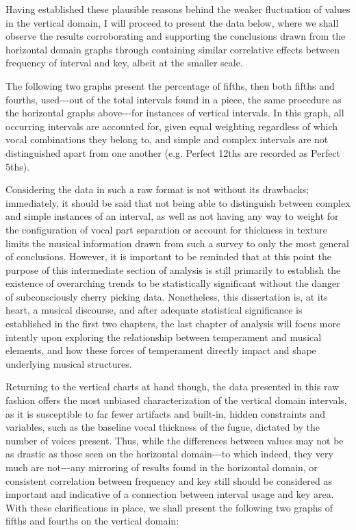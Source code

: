 Having established these plausible reasons behind the weaker fluctuation
of values in the vertical domain, I will proceed to present the data
below, where we shall observe the results corroborating and supporting
the conclusions drawn from the horizontal domain graphs through
containing similar correlative effects between frequency of interval and
key, albeit at the smaller scale.

    The following two graphs present the percentage of fifths, then both
fifths and fourths, used-\/-\/-out of the total intervals found in a
piece, the same procedure as the horizontal graphs above-\/-\/-for
instances of vertical intervals. In this graph, all occurring intervals
are accounted for, given equal weighting regardless of which vocal
combinations they belong to, and simple and complex intervals are not
distinguished apart from one another (e.g. Perfect 12ths are recorded as
Perfect 5ths).

Considering the data in such a raw format is not without its drawbacks;
immediately, it should be said that not being able to distinguish
between complex and simple instances of an interval, as well as not
having any way to weight for the configuration of vocal part separation
or account for thickness in texture limits the musical information drawn
from such a survey to only the most general of conclusions. However, it
is important to be reminded that at this point the purpose of this
intermediate section of analysis is still primarily to establish the
existence of overarching trends to be statistically significant without
the danger of subconsciously cherry picking data. Nonetheless, this
dissertation is, at its heart, a musical discourse, and after adequate
statistical significance is established in the first two chapters, the
last chapter of analysis will focus more intently upon exploring the
relationship between temperament and musical elements, and how these
forces of temperament directly impact and shape underlying musical
structures.

Returning to the vertical charts at hand though, the data presented in
this raw fashion offers the most unbiased characterization of the
vertical domain intervals, as it is susceptible to far fewer artifacts
and built-in, hidden constraints and variables, such as the baseline
vocal thickness of the fugue, dictated by the number of voices present.
Thus, while the differences between values may not be as drastic as
those seen on the horizontal domain-\/-\/-to which indeed, they very
much are not-\/-\/-any mirroring of results found in the horizontal
domain, or consistent correlation between frequency and key still should
be considered as important and indicative of a connection between
interval usage and key area. With these clarifications in place, we
shall present the following two graphs of fifths and fourths on the
vertical domain:


